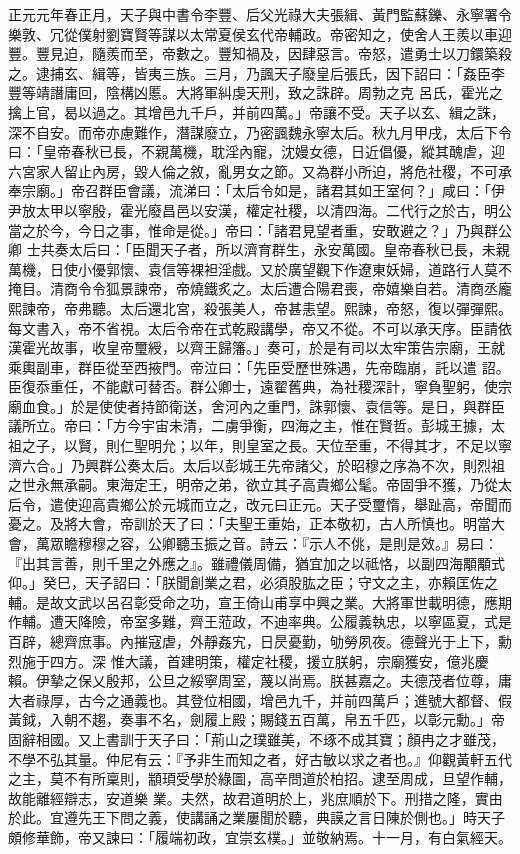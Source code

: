 \begin{pinyinscope}
 正元元年春正月，天子與中書令李豐、后父光祿大夫張緝、黃門監蘇鑠、永寧署令樂敦、冗從僕射劉寶賢等謀以太常夏侯玄代帝輔政。帝密知之，使舍人王羨以車迎豐。豐見迫，隨羨而至，帝數之。豐知禍及，因肆惡言。帝怒，遣勇士以刀鐶築殺之。逮捕玄、緝等，皆夷三族。三月，乃諷天子廢皇后張氏，因下詔曰：「姦臣李豐等靖譖庸回，陰構凶慝。大將軍糾虔天刑，致之誅辟。周勃之克
 呂氏，霍光之擒上官，曷以過之。其增邑九千戶，并前四萬。」帝讓不受。天子以玄、緝之誅，深不自安。而帝亦慮難作，潛謀廢立，乃密諷魏永寧太后。秋九月甲戌，太后下令曰：「皇帝春秋已長，不親萬機，耽淫內寵，沈嫚女德，日近倡優，縱其醜虐，迎六宮家人留止內房，毀人倫之敘，亂男女之節。又為群小所迫，將危社稷，不可承奉宗廟。」帝召群臣會議，流涕曰：「太后令如是，諸君其如王室何？」咸曰：「伊尹放太甲以寧殷，霍光廢昌邑以安漢，權定社稷，以清四海。二代行之於古，明公當之於今，今日之事，惟命是從。」帝曰：「諸君見望者重，安敢避之？」乃與群公卿
 士共奏太后曰：「臣聞天子者，所以濟育群生，永安萬國。皇帝春秋已長，未親萬機，日使小優郭懷、袁信等裸袒淫戲。又於廣望觀下作遼東妖婦，道路行人莫不掩目。清商令令狐景諫帝，帝燒鐵炙之。太后遭合陽君喪，帝嬉樂自若。清商丞龐熙諫帝，帝弗聽。太后還北宮，殺張美人，帝甚恚望。熙諫，帝怒，復以彈彈熙。每文書入，帝不省視。太后令帝在式乾殿講學，帝又不從。不可以承天序。臣請依漢霍光故事，收皇帝璽綬，以齊王歸籓。」奏可，於是有司以太牢策告宗廟，王就乘輿副車，群臣從至西掖門。帝泣曰：「先臣受歷世殊遇，先帝臨崩，託以遣
 詔。臣復忝重任，不能獻可替否。群公卿士，遠翟舊典，為社稷深計，寧負聖躬，使宗廟血食。」於是使使者持節衛送，舍河內之重門，誅郭懷、袁信等。是日，與群臣議所立。帝曰：「方今宇宙未清，二虜爭衡，四海之主，惟在賢哲。彭城王據，太祖之子，以賢，則仁聖明允；以年，則皇室之長。天位至重，不得其才，不足以寧濟六合。」乃興群公奏太后。太后以彭城王先帝諸父，於昭穆之序為不次，則烈祖之世永無承嗣。東海定王，明帝之弟，欲立其子高貴鄉公髦。帝固爭不獲，乃從太后令，遣使迎高貴鄉公於元城而立之，改元曰正元。天子受璽惰，舉趾高，帝聞而
 憂之。及將大會，帝訓於天了曰：「夫聖王重始，正本敬初，古人所慎也。明當大會，萬眾瞻穆穆之容，公卿聽玉振之音。詩云：『示人不佻，是則是效。』易曰：『出其言善，則千里之外應之』。雖禮儀周備，猶宜加之以祗恪，以副四海顒顒式仰。」癸巳，天子詔曰：「朕聞創業之君，必須股肱之臣；守文之主，亦賴匡佐之輔。是故文武以呂召彰受命之功，宣王倚山甫享中興之業。大將軍世載明德，應期作輔。遭天降險，帝室多難，齊王蒞政，不迪率典。公履義執忠，以寧區夏，式是百辟，總齊庶事。內摧寇虐，外靜姦宄，日昃憂勤，劬勞夙夜。德聲光于上下，勳烈施于四方。深
 惟大議，首建明策，權定社稷，援立朕躬，宗廟獲安，億兆慶賴。伊摯之保乂殷邦，公旦之綏寧周室，蔑以尚焉。朕甚嘉之。夫德茂者位尊，庸大者祿厚，古今之通義也。其登位相國，增邑九千，并前四萬戶；進號大都督、假黃鉞，入朝不趨，奏事不名，劍履上殿；賜錢五百萬，帛五千匹，以彰元勳。」帝固辭相國。又上書訓于天子曰：「荊山之璞雖美，不琢不成其寶；顏冉之才雖茂，不學不弘其量。仲尼有云：『予非生而知之者，好古敏以求之者也。』仰觀黃軒五代之主，莫不有所稟則，顓頊受學於綠圖，高辛問道於柏招。逮至周成，旦望作輔，故能離經辯志，安道樂
 業。夫然，故君道明於上，兆庶順於下。刑措之隆，實由於此。宜遵先王下問之義，使講誦之業屢聞於聽，典謨之言日陳於側也。」時天子頗修華飾，帝又諫曰：「履端初政，宜崇玄樸。」並敬納焉。十一月，有白氣經天。




\end{pinyinscope}
